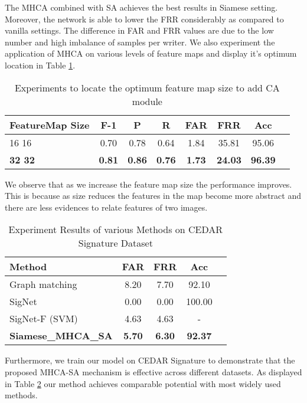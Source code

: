 \documentclass[a4paper,conference]{IEEEtran}
\begin{document}
The MHCA combined with SA achieves the best results in Siamese setting. Moreover, the network is able to lower the FRR considerably as compared to vanilla settings. The difference in FAR and FRR values are due to the low number and high imbalance of samples per writer. We also experiment the application of MHCA on various levels of feature maps and display it's optimum location in Table \ref{tab:ca_postion}.
\begin{table}[!htp]\centering
\caption{Experiments to locate the optimum feature map size to add CA module}\label{tab:ca_postion}
\scriptsize
\begin{tabular}{lccccccc}\toprule
\textbf{FeatureMap Size} &\textbf{F-1} &\textbf{P} &\textbf{R} &\textbf{FAR} &\textbf{FRR} &\textbf{Acc} \\\midrule
16  16 &0.70 &0.78 &0.64 &1.84 &35.81 &95.06 \\
\textbf{32  32} &\textbf{0.81} &\textbf{0.86} &\textbf{0.76} &\textbf{1.73} &\textbf{24.03} &\textbf{96.39} \\
\bottomrule
\end{tabular}
\end{table}
We observe that as we increase the feature map size the performance improves. This is because as size reduces the features in the map become more abstract and there are less evidences to relate features of two images. \cite{zhang_self-attention_2019}
\begin{table}[!htp]\centering
\caption{Experiment Results of various Methods on CEDAR Signature Dataset}\label{tab:sign_compare}
\scriptsize
\begin{tabular}{lcccc}\toprule
\textbf{Method} &\textbf{FAR} &\textbf{FRR} &\textbf{Acc} \\\midrule
Graph matching \cite{chen_graph_signature} &8.20 &7.70 &92.10 \\
SigNet \cite{dey2017signet} &0.00 &0.00 &100.00 \\
SigNet-F (SVM) \cite{Hafemann_2017} &4.63 &4.63 &- \\
\textbf{Siamese\_MHCA\_SA} &\textbf{5.70} &\textbf{6.30} &\textbf{92.37} \\
\bottomrule
\end{tabular}
\end{table}
\newline \indent Furthermore, we train our model on CEDAR Signature \cite{signature_verif_dataset} to demonstrate that the proposed MHCA-SA mechanism is effective across different datasets. As displayed in Table \ref{tab:sign_compare} our method achieves comparable potential with most widely used methods. 
\end{document}
